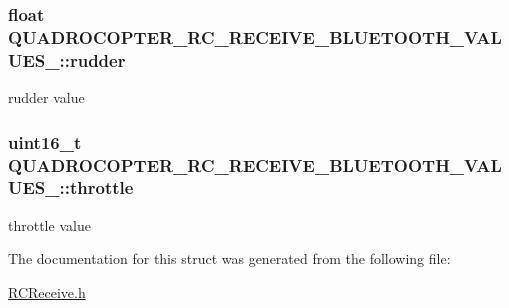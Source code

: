 \subsubsection[{\texorpdfstring{rudder}{rudder}}]{\setlength{\rightskip}{0pt plus 5cm}float Q\+U\+A\+D\+R\+O\+C\+O\+P\+T\+E\+R\+\_\+\+R\+C\+\_\+\+R\+E\+C\+E\+I\+V\+E\+\_\+\+B\+L\+U\+E\+T\+O\+O\+T\+H\+\_\+\+V\+A\+L\+U\+E\+S\+\_\+\+::rudder}\hypertarget{struct_q_u_a_d_r_o_c_o_p_t_e_r___r_c___r_e_c_e_i_v_e___b_l_u_e_t_o_o_t_h___v_a_l_u_e_s___a6ce3ff8126ce78562ca5228b5cb8253f}{}\label{struct_q_u_a_d_r_o_c_o_p_t_e_r___r_c___r_e_c_e_i_v_e___b_l_u_e_t_o_o_t_h___v_a_l_u_e_s___a6ce3ff8126ce78562ca5228b5cb8253f}
rudder value 
\subsubsection[{\texorpdfstring{throttle}{throttle}}]{\setlength{\rightskip}{0pt plus 5cm}uint16\+\_\+t Q\+U\+A\+D\+R\+O\+C\+O\+P\+T\+E\+R\+\_\+\+R\+C\+\_\+\+R\+E\+C\+E\+I\+V\+E\+\_\+\+B\+L\+U\+E\+T\+O\+O\+T\+H\+\_\+\+V\+A\+L\+U\+E\+S\+\_\+\+::throttle}\hypertarget{struct_q_u_a_d_r_o_c_o_p_t_e_r___r_c___r_e_c_e_i_v_e___b_l_u_e_t_o_o_t_h___v_a_l_u_e_s___acd650840da79ce4d3453425ad4cd4ae0}{}\label{struct_q_u_a_d_r_o_c_o_p_t_e_r___r_c___r_e_c_e_i_v_e___b_l_u_e_t_o_o_t_h___v_a_l_u_e_s___acd650840da79ce4d3453425ad4cd4ae0}
throttle value 

The documentation for this struct was generated from the following file\+:\begin{DoxyCompactItemize}
\item 
\hyperlink{_r_c_receive_8h}{R\+C\+Receive.\+h}\end{DoxyCompactItemize}
